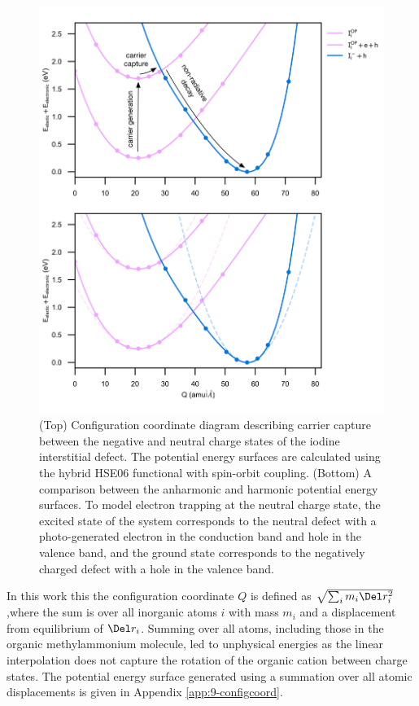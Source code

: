 \begin{figure}[h!]   
\centering
  \includegraphics[width=1.0\columnwidth]{figures/ch6/carrier_capture_digram.png}
  \caption[Configuration coordinate diagram describing carrier capture between negative and neutral charge states of the iodine interstitial defect]{(Top) Configuration coordinate diagram describing carrier capture between the negative and neutral charge states of the iodine interstitial defect. The potential energy surfaces are calculated using the hybrid HSE06 functional with spin-orbit coupling. (Bottom) A comparison between the anharmonic and harmonic potential energy surfaces. To model electron trapping at the neutral charge state, the excited state of the system corresponds to the neutral defect with a photo-generated electron in the conduction band and hole in the valence band, and the ground state corresponds to the negatively charged defect with a hole in the valence band. }
\label{configuration_coordinate}
\end{figure}


In this work this the configuration coordinate $Q$ is defined as $\sqrt{\sum_i m_i \Del r_i^2}$ ,where the sum is over all inorganic atoms $i$ with mass $m_i$ and a displacement from equilibrium of $\Del r_i$. Summing over all atoms, including those in the organic methylammonium molecule, led to unphysical energies as the linear interpolation does not capture the rotation of the organic cation between charge states. The potential energy surface generated using a summation over all atomic displacements is given in Appendix \ref{app:9-configcoord}.

